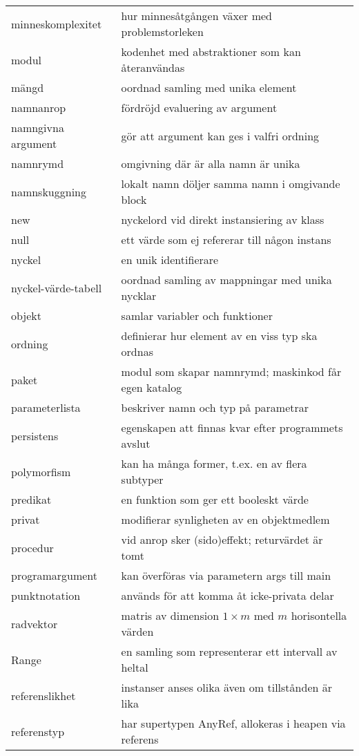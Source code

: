 \begin{tabular}{l|l}
minneskomplexitet & hur minnesåtgången växer med problemstorleken \\
modul & kodenhet med abstraktioner som kan återanvändas \\
mängd & oordnad samling med unika element \\
namnanrop & fördröjd evaluering av argument \\
namngivna argument & gör att argument kan ges i valfri ordning \\
namnrymd & omgivning där är alla namn är unika \\
namnskuggning & lokalt namn döljer samma namn i omgivande block \\
new & nyckelord vid direkt instansiering av klass \\
null & ett värde som ej refererar till någon instans \\
nyckel & en unik identifierare \\
nyckel-värde-tabell & oordnad samling av mappningar med unika nycklar \\
objekt & samlar variabler och funktioner \\
ordning & definierar hur element av en viss typ ska ordnas \\
paket & modul som skapar namnrymd; maskinkod får egen katalog \\
parameterlista & beskriver namn och typ på parametrar \\
persistens & egenskapen att finnas kvar efter programmets avslut \\
polymorfism & kan ha många former, t.ex. en av flera subtyper \\
predikat & en funktion som ger ett booleskt värde \\
privat & modifierar synligheten av en objektmedlem \\
procedur & vid anrop sker (sido)effekt; returvärdet är tomt \\
programargument & kan överföras via parametern args till main \\
punktnotation & används för att komma åt icke-privata delar \\
radvektor & matris av dimension $1\times{}m$ med $m$ horisontella värden \\
Range & en samling som representerar ett intervall av heltal \\
referenslikhet & instanser anses olika även om tillstånden är lika \\
referenstyp & har supertypen AnyRef, allokeras i heapen via referens \\

\end{tabular}
